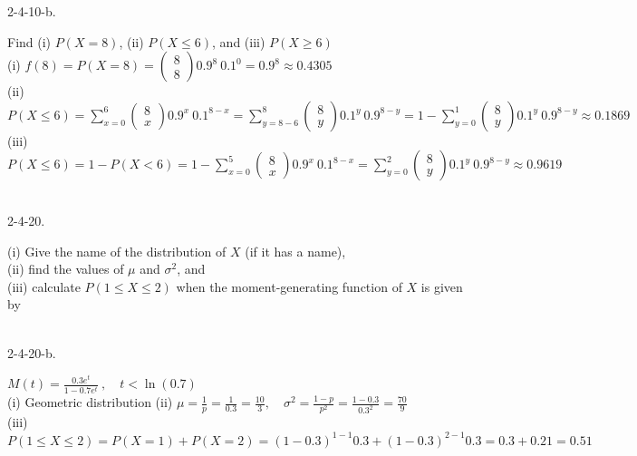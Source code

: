 \documentclass[12pt]{book}
\begin{document}
\begin{CJK}{UTF8}{bsmi}
2-4-10-b. \begin{minipage}[t]{\dimexpr\linewidth-2em}
Find (i) $P(X = 8)$, (ii) $P(X \le 6)$, and (iii) $P(X \ge 6)$ \\
(i) $f(8)=P(X = 8)=\left(\begin{matrix}
8\\8
\end{matrix}\right)0.9^8\ 0.1^0=0.9^8\approx0.4305$ \\
(ii) $\displaystyle P(X\le6)=\sum_{x=0}^6\left(\begin{matrix}
8\\x
\end{matrix}\right)0.9^x\ 0.1^{8-x}=\sum_{y=8-6}^{8}\left(\begin{matrix}
8\\y
\end{matrix}\right)0.1^y\ 0.9^{8-y}=1-\sum_{y=0}^{1}\left(\begin{matrix}
8\\y
\end{matrix}\right)0.1^y\ 0.9^{8-y}\approx0.1869$ \\
(iii) $\displaystyle P(X\le6)=1-P(X<6)=1-\sum_{x=0}^5\left(\begin{matrix}
8\\x
\end{matrix}\right)0.9^x\ 0.1^{8-x}=\sum_{y=0}^{2}\left(\begin{matrix}
8\\y
\end{matrix}\right)0.1^y\ 0.9^{8-y}\approx0.9619$
\end{minipage}\\

2-4-20. \begin{minipage}[t]{\dimexpr\linewidth-2em}
(i) Give the name of the distribution of $X$ (if it has
a name), \\
(ii) find the values of $\mu$ and $\sigma^2$, and \\
(iii) calculate $P(1 \le X \le 2)$ when the moment-generating function
of $X$ is given by
\end{minipage}\\

2-4-20-b. \begin{minipage}[t]{\dimexpr\linewidth-2em}
$\displaystyle M(t)=\frac{0.3e^t}{1-0.7e^t}\ ,\quad t<\ln(0.7)$ \\
(i) Geometric distribution \quad(ii) $\displaystyle \mu=\frac{1}{p}=\frac{1}{0.3}=\frac{10}{3},\quad\sigma^2=\frac{1-p}{p^2}=\frac{1-0.3}{0.3^2}=\frac{70}{9}$ \\
(iii) $P(1 \le X \le 2)=P(X=1)+P(X=2)=(1-0.3)^{1-1}0.3+(1-0.3)^{2-1}0.3=0.3+0.21=0.51$
\end{minipage}\\


\end{CJK}
\end{document}
